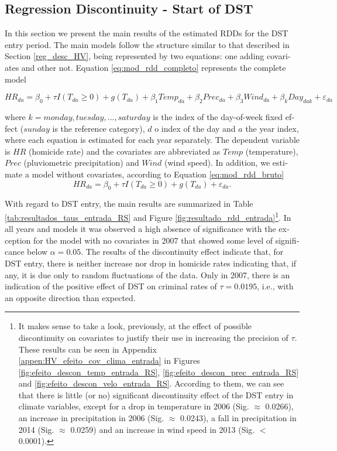 \documentclass[12pt,openright,oneside,a4paper,english,french,spanish]{abntex2}
\numberwithin{table}{section} %
\numberwithin{figure}{section} %
\begin{document}
\begin{otherlanguage}{english}
\subsection{Regression Discontinuity - Start of DST\label{resultados_RDD_entrada}}

In this section we present the main results of the estimated RDDs for the DST entry period. The main models follow the structure similar to that described in Section \ref{reg_desc_HV}, being represented by two equations: one adding covariates and other not. Equation \ref{eq:mod_rdd_completo} represents the complete model

\begin{small}
\begin{equation}
HR_{da}=\beta_{0}+\tau I(T_{da}\geq 0)+g(T_{da})+\beta_{1}Temp_{da}+\beta_{2}Prec_{da}+\beta_{3}Wind_{da} + \beta_{k}Day_{dak} + \varepsilon_{da}
\label{eq:mod_rdd_completo}
\end{equation}
\end{small}
where $k = monday, tuesday, ..., saturday$ is the index of the day-of-week fixed effect ($sunday$ is the reference category), $d$ o index of the day and $a$ the year index, where each equation is estimated for each year separately. The dependent variable is $HR$ (homicide rate) and the covariates are abbreviated as $Temp$ (temperature), $Prec$ (pluviometric precipitation) and $Wind$ (wind speed). In addition, we estimate a model without covariates, according to Equation \ref{eq:mod_rdd_bruto}
\begin{equation}
HR_{da}=\beta_{0}+\tau I(T_{da}\geq 0)+g(T_{da}) + \varepsilon_{da}.
\label{eq:mod_rdd_bruto}
\end{equation}

With regard to DST entry, the main results are summarized in Table \ref{tab:resultados_taus_entrada_RS} and Figure \ref{fig:resultado_rdd_entrada}\footnote{It makes sense to take a look, previously, at the effect of possible discontinuity on covariates to justify their use in increasing the precision of $\tau$. These results can be seen in Appendix \ref{appen:HV_efeito_cov_clima_entrada} in Figures \ref{fig:efeito_descon_temp_entrada_RS}, \ref{fig:efeito_descon_prec_entrada_RS} and \ref{fig:efeito_descon_velo_entrada_RS}. According to them, we can see that there is little (or no) significant discontinuity effect of the DST entry in climate variables, except for a drop in temperature in 2006 (Sig. $\approx$ 0.0266), an increase in precipitation in 2006 (Sig. $\approx$ 0.0243), a fall in precipitation in 2014 (Sig. $\approx$ 0.0259) and an increase in wind speed in 2013 (Sig. $<$ 0.0001).}. In all years and models it was observed a high absence of significance with the exception for the model with no covariates in 2007 that showed some level of significance below $\alpha = 0.05$. The results of the discontinuity effect indicate that, for DST entry, there is neither increase nor drop in homicide rates indicating that, if any, it is due only to random fluctuations of the data. Only in 2007, there is an indication of the positive effect of DST on criminal rates of $\tau = 0.0195$, i.e., with an opposite direction than expected.



\end{otherlanguage}
\end{document}
